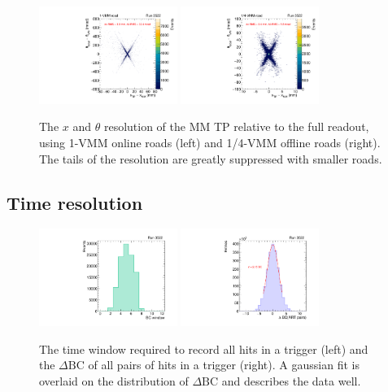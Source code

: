 \begin{figure}[!htpb]
  \begin{center}
    \includegraphics[width=0.4\textwidth]{figures/gbtanalysis3522/TP_xres_angres_full.pdf}
    \includegraphics[width=0.4\textwidth]{figures/gbtanalysis3522/TP_xres_angres.pdf}
  \end{center}
  \vspace{-10pt}
  \caption{The $x$ and $\theta$ resolution of the MM TP relative to the full readout, using 1-VMM online roads (left) and 1/4-VMM offline roads (right). The tails of the resolution are greatly suppressed with smaller roads.}
  \label{fig:xthetares}
\end{figure}


\subsection{Time resolution}

\begin{figure}[!htpb]
  \begin{center}
    \includegraphics[width=0.4\textwidth]{figures/gbtanalysis3522/artwin_lin.pdf}
    \includegraphics[width=0.4\textwidth]{figures/gbtanalysis3522/artrpairs_lin.pdf}
  \end{center}
  \vspace{-10pt}
  \caption{The time window required to record all hits in a trigger (left) and the $\Delta\text{BC}$ of all pairs of hits in a trigger (right). A gaussian fit is overlaid on the distribution of $\Delta\text{BC}$ and describes the data well.}
  \label{fig:time}
\end{figure}

